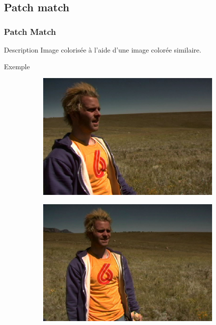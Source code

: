 \documentclass{beamer}
\begin{document}
\subsection{Patch match}
\begin{frame}
    \frametitle{Patch Match}
    \begin{block}{Description}
        Image colorisée à l’aide d’une image colorée similaire.
    \end{block}
    \begin{exampleblock}{Exemple}
        \begin{figure}[h]
            \centering
            \begin{subfigure}{0.3\textwidth}
                \includegraphics[width=\textwidth]{img/patchmatch_left}
                \caption{}
            \end{subfigure}
            \begin{subfigure}{0.3\textwidth}
                \includegraphics[width=\textwidth]{img/patchmatch_right}

\end{subfigure}
\end{figure}
\end{exampleblock}
\end{frame}
\end{document}

